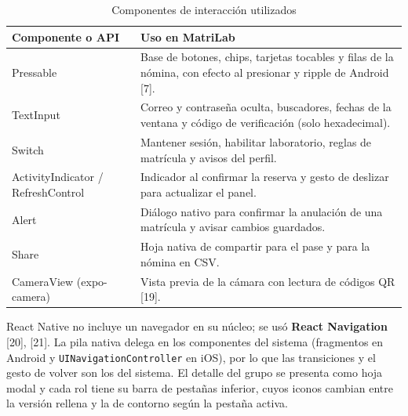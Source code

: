 \begin{table}[H]
\centering\small
\caption{Componentes de interacción utilizados}\label{tab:interaccion}
\renewcommand{\arraystretch}{1.25}
\begin{tabular}{|>{\raggedright\arraybackslash}p{}|>{\raggedright\arraybackslash}p{}|}
\hline
\rowcolor{colabpyblue} \color{white}\textbf{Componente o API} & \color{white}\textbf{Uso en MatriLab} \\ \hline
Pressable & Base de botones, chips, tarjetas tocables y filas de la nómina, con efecto al presionar y ripple de Android [7]. \\ \hline
\rowcolor{colabpybg} TextInput & Correo y contraseña oculta, buscadores, fechas de la ventana y código de verificación (solo hexadecimal). \\ \hline
Switch & Mantener sesión, habilitar laboratorio, reglas de matrícula y avisos del perfil. \\ \hline
\rowcolor{colabpybg} ActivityIndicator / RefreshControl & Indicador al confirmar la reserva y gesto de deslizar para actualizar el panel. \\ \hline
Alert & Diálogo nativo para confirmar la anulación de una matrícula y avisar cambios guardados. \\ \hline
\rowcolor{colabpybg} Share & Hoja nativa de compartir para el pase y para la nómina en CSV. \\ \hline
CameraView (expo-camera) & Vista previa de la cámara con lectura de códigos QR [19]. \\ \hline
\end{tabular}
\end{table}

\vspace{0.2cm}

React Native no incluye un navegador en su núcleo; se usó \textbf{React Navigation} [20], [21]. La pila nativa delega en los componentes del sistema (fragmentos en Android y \texttt{UINavigation\allowbreak{}Controller} en iOS), por lo que las transiciones y el gesto de volver son los del sistema. El detalle del grupo se presenta como hoja modal y cada rol tiene su barra de pestañas inferior, cuyos iconos cambian entre la versión rellena y la de contorno según la pestaña activa.

